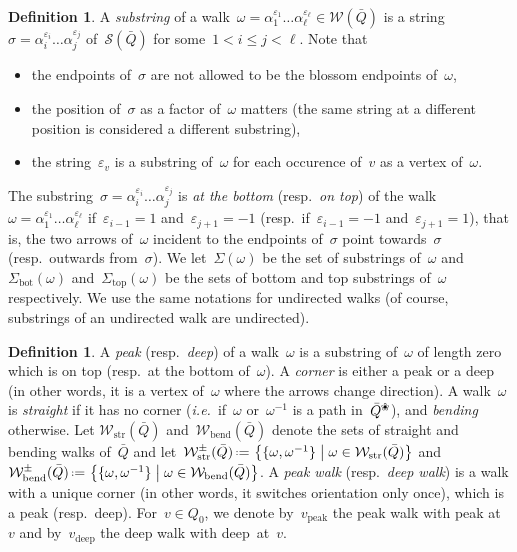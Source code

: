 \documentclass{amsart}
\theoremstyle{definition}
\newtheorem{definition}[theorem]{Definition}
\newcommand{\set}[2]{\left\{ #1 \;\middle|\; #2 \right\}} %
\newcommand{\eqdef}{\mbox{\,\raisebox{0.2ex}{\scriptsize\ensuremath{\mathrm:}}\ensuremath{=}\,}} %
\newcommand{\ie}{\textit{i.e.}~} %
\newcommand{\darkblue}{\color{darkblue}} %
\newcommand{\defn}[1]{\textsl{\darkblue #1}} %
\newcommand{\blossom}{^\text{\ding{96}}} %
\newcommand{\strings}{\mathcal{S}} %
\newcommand{\walks}{\mathcal{W}} %
\newcommand{\straightWalks}{\mathcal{W}_\mathrm{str}} %
\newcommand{\bendingWalks}{\mathcal{W}_\mathrm{bend}} %
\newcommand{\peak}{\mathrm{peak}} %
\newcommand{\deep}{\mathrm{deep}} %
\renewcommand{\top}{\mathrm{top}} %
\newcommand{\bottom}{\mathrm{bot}} %
\begin{document}
\begin{definition}
\label{def:substrings}
A \defn{substring} of a walk~$\omega = \alpha_1^{\varepsilon_1} \dots \alpha_\ell^{\varepsilon_\ell} \in \walks(\bar Q)$ is a string~$\sigma = \alpha_i^{\varepsilon_i} \dots \alpha_j^{\varepsilon_j}$ of~$\strings(\bar Q)$ for some~$1 < i \le j < \ell$.
Note that 
\begin{itemize}
\item the endpoints of~$\sigma$ are not allowed to be the blossom endpoints of~$\omega$,
\item the position of~$\sigma$ as a factor of~$\omega$ matters (the same string at a different position is considered a different substring),
\item the string~$\varepsilon_v$ is a substring of~$\omega$ for each occurence of~$v$ as a vertex of~$\omega$.
\end{itemize}
The substring~$\sigma = \alpha_i^{\varepsilon_i} \dots \alpha_j^{\varepsilon_j}$ is \defn{at the bottom} (resp.~\defn{on top}) of the walk~$\omega = \alpha_1^{\varepsilon_1} \dots \alpha_\ell^{\varepsilon_\ell}$ if~$\varepsilon_{i-1} = 1$ and~$\varepsilon_{j+1} = -1$ (resp.~if~$\varepsilon_{i-1} = -1$ and~$\varepsilon_{j+1} = 1$), that is, the two arrows of~$\omega$ incident to the endpoints of~$\sigma$ point towards~$\sigma$ (resp.~outwards from~$\sigma$).
We let~$\Sigma(\omega)$ be the set of substrings of~$\omega$ and~$\Sigma_\bottom(\omega)$ and~$\Sigma_\top(\omega)$ be the sets of bottom and top substrings of~$\omega$ respectively.
We use the same notations for undirected walks (of course, substrings of an undirected walk are undirected).
\end{definition}

\begin{definition}
\label{def:straightBended}
A \defn{peak} (resp.~\defn{deep}) of a walk~$\omega$ is a substring of~$\omega$ of length zero which is on top (resp.~at the bottom of~$\omega$).
A \defn{corner} is either a peak or a deep (in other words, it is a vertex of~$\omega$ where the arrows change direction).
A walk~$\omega$ is \defn{straight} if it has no corner (\ie if~$\omega$ or~$\omega^{-1}$ is a path in~$\bar Q\blossom$), and \defn{bending} otherwise. Let $\straightWalks(\bar Q)$ and~$\bendingWalks(\bar Q)$ denote the sets of straight and bending walks of~$\bar Q$ and let~$\straightWalks^\pm(\bar Q) \eqdef \set{\{\omega, \omega^{-1}\}}{\omega \in \straightWalks(\bar Q)}$ and~$\bendingWalks^\pm(\bar Q) \eqdef \set{\{\omega, \omega^{-1}\}}{\omega \in \bendingWalks(\bar Q)}$.
A \defn{peak walk} (resp.~\defn{deep walk}) is a walk with a unique corner (in other words, it switches orientation only once), which is a peak (resp.~deep). For~$v \in Q_0$, we denote by~$v_\peak$ the peak walk with peak at~$v$ and by~$v_\deep$ the deep walk with deep~at~$v$.
\end{definition}
\end{document}
